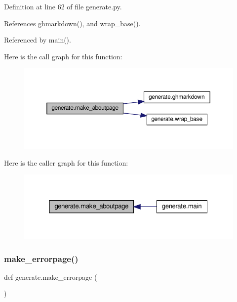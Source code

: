 Definition at line 62 of file generate.\+py.



References ghmarkdown(), and wrap\+\_\+base().



Referenced by main().

Here is the call graph for this function\+:
\nopagebreak
\begin{figure}[H]
\begin{center}
\leavevmode
\includegraphics[width=350pt]{namespacegenerate_afa732feea0def89a5b9d1a2a6549ee60_cgraph}
\end{center}
\end{figure}
Here is the caller graph for this function\+:
\nopagebreak
\begin{figure}[H]
\begin{center}
\leavevmode
\includegraphics[width=325pt]{namespacegenerate_afa732feea0def89a5b9d1a2a6549ee60_icgraph}
\end{center}
\end{figure}
\mbox{\label{namespacegenerate_a1c52bc54613c3a13c908bc65d7911b8e}} 
\subsubsection{\texorpdfstring{make\+\_\+errorpage()}{make\_errorpage()}}
{\footnotesize\ttfamily def generate.\+make\+\_\+errorpage (\begin{DoxyParamCaption}{ }\end{DoxyParamCaption})}



